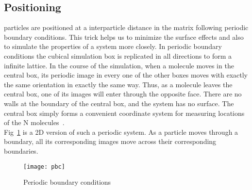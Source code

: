 \documentclass[12pt]{iiscthes}
\theoremstyle{definition}
\theoremstyle{definition}
\theoremstyle{remark}
\begin{document}
\subsection{Positioning}
particles are positioned at a interparticle distance in the matrix following periodic boundary conditions. This trick helps us to minimize the surface effects and also to simulate the properties of a system more closely. In periodic boundary conditions the cubical simulation box is replicated in all directions to form a infinite lattice. In the course of the simulation, when a molecule moves in the central box, its periodic image in every one of the other boxes moves with exactly the same orientation in exactly the same way. Thus, as a molecule leaves the central box, one of its images will enter through the opposite face. There are no walls at the boundary of the central box, and the system has no surface. The central box simply forms a convenient coordinate system for measuring locations of the N molecules~\cite{Link}.\\
Fig~\ref{pbc} is  a 2D version of such a periodic system. As a particle moves through a boundary, all its corresponding images move across their corresponding boundaries.
\begin{figure}[h]
\begin{center}
\texttt{[image: pbc]}
\caption{Periodic boundary conditions}\label{pbc}
\end{center}
\end{figure} 
\end{document}
